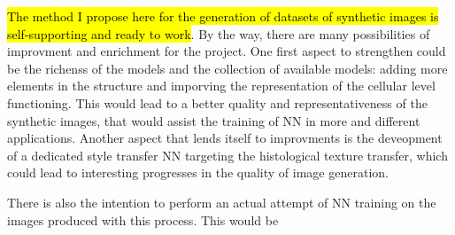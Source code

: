 \hl{The method I propose here for the generation of datasets of synthetic images is self-supporting and ready to work}. By the way, there are many possibilities of improvment and enrichment for the project. One first aspect to strengthen could be the richenss of the models and the collection of available models: adding more elements in the structure and imporving the representation of the cellular level functioning. This would lead to a better quality and representativeness of the synthetic images, that would assist the training of NN in more and different applications. Another aspect that lends itself to improvments is the deveopment of a dedicated style transfer NN targeting the histological texture transfer, which could lead to interesting progresses in the quality of image generation.

There is also the intention to perform an actual attempt of NN training on the images produced with this process. This would be 
